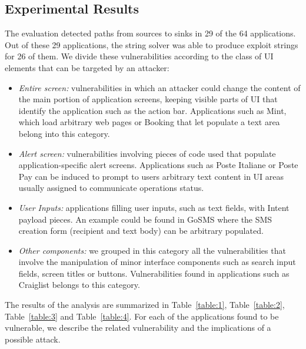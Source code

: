 \subsection{Experimental Results}
The evaluation detected paths from sources to sinks in 29 of the 64 applications. Out of these 29 applications, the string solver was able to produce exploit strings for 26 of them. We divide these vulnerabilities according to the class of UI elements that can be targeted by an attacker:
\begin{itemize}
    \item\emph{Entire screen:} vulnerabilities in which
        an attacker could change the content of the main portion of application screens, keeping
        visible parts of UI that identify the application such as the action bar.
        Applications such as Mint, which load arbitrary web pages or Booking that let populate a text area belong into this category.
    \item\emph{Alert screen:} vulnerabilities involving pieces of code used that populate application-specific alert screens. Applications such as Poste Italiane or Poste Pay can be induced to prompt to users arbitrary text content in UI areas usually
        assigned to communicate operations status.
    \item\emph{User Inputs:} applications filling user inputs, such as text fields, with Intent
        payload pieces. An example could be found in GoSMS where the
        SMS creation form (recipient and text body) can be arbitrary populated.
    \item\emph{Other components:} we grouped in this category all the vulnerabilities that involve
        the manipulation of minor interface components such as search input fields, screen titles or
        buttons. Vulnerabilities found in applications such as Craiglist belongs to this category.
\end{itemize}

The results of the analysis are summarized in Table~\ref{table:1}, Table~\ref{table:2}, Table~\ref{table:3}
 and Table~\ref{table:4}. For each of the applications found to be vulnerable, we describe the related vulnerability and the implications of a possible attack.


